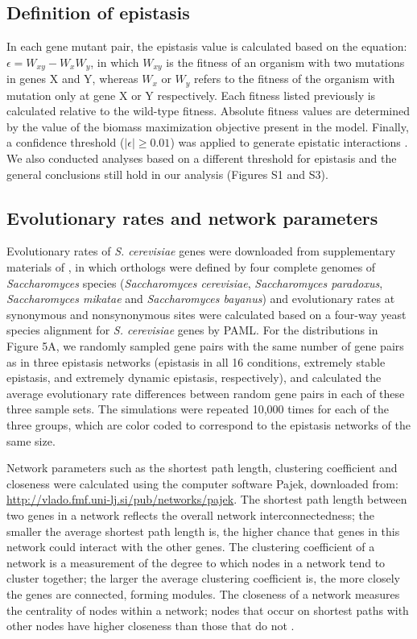 \subsection{Definition of epistasis}

In each gene mutant pair, the epistasis value is calculated based on
the equation: $\epsilon = W_{xy} - W_xW_y$, in which $W_{xy}$ is the
fitness of an organism with two mutations in genes X and Y, whereas
$W_{x}$ or $W_{y}$ refers to the fitness of the organism with mutation
only at gene X or Y respectively. Each fitness listed previously is
calculated relative to the wild-type fitness. Absolute fitness values
are determined by the value of the biomass maximization objective
present in the model. Finally, a confidence threshold
($\left|\epsilon\right| \geq 0.01$) was applied to generate epistatic
interactions \citep{Xu2012, Costanzo2010, He2010}. We also conducted
analyses based on a different threshold for epistasis and the general
conclusions still hold in our analysis (Figures S1 and S3).

\subsection{Evolutionary rates and network parameters}

Evolutionary rates of \textit{S. cerevisiae} genes were downloaded
from supplementary materials of \citealt{Wall2005}, in which orthologs were
defined by four complete genomes of \textit{Saccharomyces} species
(\textit{Saccharomyces cerevisiae}, \textit{Saccharomyces paradoxus},
\textit{Saccharomyces mikatae} and \textit{Saccharomyces bayanus}) and
evolutionary rates at synonymous and nonsynonymous sites were
calculated based on a four-way yeast species alignment for
\textit{S. cerevisiae} genes by PAML. For the distributions in Figure
5A, we randomly sampled gene pairs with the same number of gene pairs
as in three epistasis networks (epistasis in all 16 conditions,
extremely stable epistasis, and extremely dynamic epistasis,
respectively), and calculated the average evolutionary rate
differences between random gene pairs in each of these three sample
sets. The simulations were repeated 10,000 times for each of the three
groups, which are color coded to correspond to the epistasis networks
of the same size.

Network parameters such as the shortest path length, clustering
coefficient and closeness were calculated using the computer software
Pajek, downloaded from:
\url{http://vlado.fmf.uni-lj.si/pub/networks/pajek}. The shortest path
length between two genes in a network reflects the overall network
interconnectedness; the smaller the average shortest path length is,
the higher chance that genes in this network could interact with the
other genes. The clustering coefficient of a network is a measurement
of the degree to which nodes in a network tend to cluster together;
the larger the average clustering coefficient is, the more closely the
genes are connected, forming modules. The closeness of a network
measures the centrality of nodes within a network; nodes that occur on
shortest paths with other nodes have higher closeness than those that
do not \citep{Barabasi2004}.

